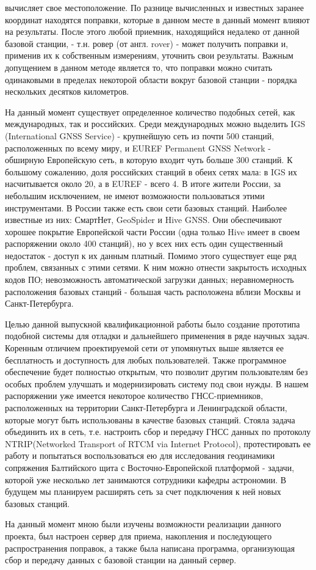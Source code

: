 \documentclass[a4paper,12pt]{report}
\begin{document}
вычисляет свое местоположение. По разнице вычисленных и известных заранее координат находятся поправки, которые в данном месте в данный 
момент влияют на результаты. После этого любой приемник, находящийся недалеко от данной базовой станции, - т.н. ровер (от англ. rover) - 
может получить поправки и, применив их к собственным измерениям, уточнить свои результаты. Важным допущением в данном методе является то, 
что поправки можно считать одинаковыми в пределах некоторой области вокруг базовой станции - порядка нескольких десятков километров. \par
На данный момент существует определенное количество подобных сетей, как международных, так и российских. Среди международных можно 
выделить IGS (International GNSS Service) - крупнейшую сеть из почти 500 станций, расположенных по всему миру, и EUREF Permanent GNSS 
Network - обширную Европейскую сеть, в которую входит чуть больше 300 станций. К большому сожалению, доля российских станций в обеих 
сетях мала: в IGS их насчитывается около 20, а в EUREF - всего 4. В итоге жители России, за небольшим исключением, не имеют возможности 
пользоваться этими инструментами. В России также есть свои сети базовых станций. Наиболее известные из них: СмартНет, GeoSpider и Hive GNSS.
Они обеспечивают хорошее покрытие Европейской части России (одна только Hive имеет в своем распоряжении около 400 станций), но у всех 
них есть один существенный недостаток - доступ к их данным платный. Помимо этого существует еще ряд проблем, связанных с этими сетями. 
К ним можно отнести закрытость исходных кодов ПО; невозможность автоматической загрузки данных; неравномерность расположения базовых 
станций - большая часть расположена вблизи Москвы и Санкт-Петербурга. \par
Целью данной выпускной квалификационной работы было создание прототипа подобной системы для отладки и дальнейшего применения в ряде
научных задач. Коренным отличием проектируемой сети от упомянутых выше является ее бесплатность и доступность для любых пользователей. 
Также программное обеспечение будет полностью открытым, что позволит другим пользователям без особых проблем улучшать и модернизировать 
систему под свои нужды.
В нашем распоряжении уже имеется некоторое количество ГНСС-приемников, расположенных на территории Санкт-Петербурга и Ленинградской
области, которые могут быть использованы в качестве базовых станций. Стояла задача объединить их в сеть, т.е. настроить сбор и передачу 
ГНСС данных по протоколу NTRIP(Networked Transport of RTCM via Internet Protocol), протестировать ее работу и попытаться воспользоваться 
ею для исследования геодинамики сопряжения Балтийского щита с Восточно-Европейской платформой - задачи, которой уже несколько лет 
занимаются сотрудники кафедры астрономии. В будущем мы планируем расширять сеть за счет подключения к ней новых базовых станций. \par
На данный момент мною были изучены возможности реализации данного проекта, был настроен сервер 
для приема, накопления и последующего распространения поправок, а также была написана программа, организующая сбор и передачу данных с 
базовой станции на данный сервер.
\newpage
\end{document}
